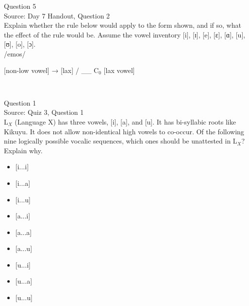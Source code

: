 \documentclass[12pt]{article}
\begin{document}
\newpage

{\large Question 5}\\

Source: Day 7 Handout, Question 2\\

Explain whether the rule below would apply to the form shown, and if so, what the effect of the rule would be. Assume the vowel inventory [i], [ɪ], [e], [ɛ], [ɑ], [u], [ʊ], [o], [ɔ].\\

/emos/

{[non-low vowel]} →  {[lax]} / \_\_ C$_0$ {[lax vowel]}


\newpage

\begin{center}
\textbf{{\color{red}{\HUGE END OF EXAM}}}\\

\end{center}
\newpage

\begin{center}
\textbf{{\color{blue}{\HUGE START OF EXAM\\}}}

\textbf{{\color{blue}{\HUGE Student ID: 3129\\}}}

\textbf{{\color{blue}{\HUGE 12:00 noon - 12:15 PM\\}}}

\end{center}
\newpage

{\large Question 1}\\

Source: Quiz 3, Question 1\\

L$_X$ (Language X) has three vowels, [i], [a], and [u]. It has bi-syllabic roots like Kikuyu. It does not allow non-identical high vowels to co-occur. Of the following nine logically possible vocalic sequences, which ones should be unattested in L$_X$? Explain why.\\

\begin{itemize} \item {[i...i]} \item {[i...a]} \item {[i...u]} \item {[a...i]} \item {[a...a]} \item {[a...u]} \item {[u...i]} \item {[u...a]} \item {[u...u]} \end{itemize}
\end{document}
